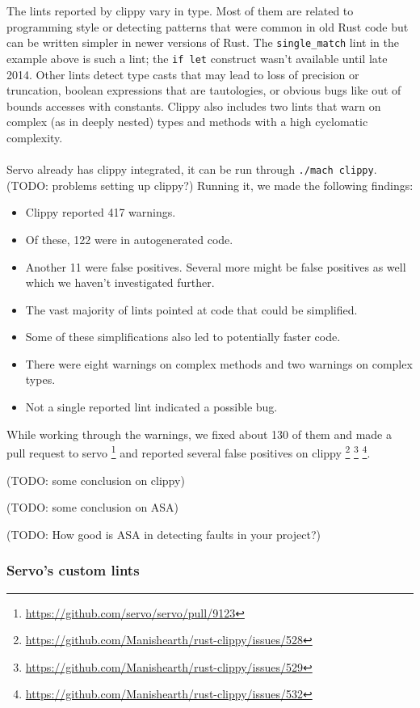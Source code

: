 \documentclass{scrartcl}
\newcommand{\todo}[1] {{\color{red}(TODO: #1)}}
\begin{document}
The lints reported by clippy vary in type. Most of them are related to programming style or detecting patterns that were common in old Rust code but can be written simpler in newer versions of Rust. The \texttt{single\_match} lint in the example above is such a lint; the \texttt{if let} construct wasn't available until late 2014. Other lints detect type casts that may lead to loss of precision or truncation, boolean expressions that are tautologies, or obvious bugs like out of bounds accesses with constants. Clippy also includes two lints that warn on complex (as in deeply nested) types and methods with a high cyclomatic complexity.\\
\\
Servo already has clippy integrated, it can be run through \texttt{./mach clippy}. \todo{problems setting up clippy?} Running it, we made the following findings: 
\begin{itemize}
	\item Clippy reported 417 warnings.
    \item Of these, 122 were in autogenerated code.
    \item Another 11 were false positives. Several more might be false positives as well which we haven't investigated further.
    \item The vast majority of lints pointed at code that could be simplified.
    \item Some of these simplifications also led to potentially faster code.
    \item There were eight warnings on complex methods and two warnings on complex types.
    \item Not a single reported lint indicated a possible bug.
\end{itemize}

While working through the warnings, we fixed about 130 of them and made a pull request to servo \footnote{\url{https://github.com/servo/servo/pull/9123}} and reported several false positives on clippy \footnote{\url{https://github.com/Manishearth/rust-clippy/issues/528}} \footnote{\url{https://github.com/Manishearth/rust-clippy/issues/529}} \footnote{\url{https://github.com/Manishearth/rust-clippy/issues/532}}.


\todo{some conclusion on clippy}

\todo{some conclusion on ASA}

\todo{How good is ASA in detecting faults in your project?}


\subsubsection{Servo's custom lints}
\end{document}
